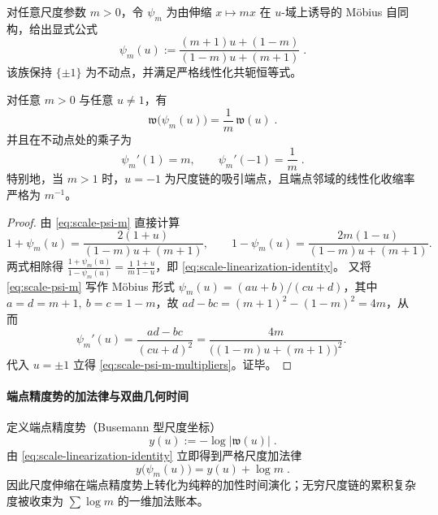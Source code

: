 \medskip
对任意尺度参数 \(m>0\)，令 \(\psi_m\) 为由伸缩 \(x\mapsto mx\) 在 \(u\)-域上诱导的 Möbius 自同构，给出显式公式
\begin{equation}\label{eq:scale-psi-m}
\boxed{\;
\psi_m(u):=\frac{(m+1)u+(1-m)}{(1-m)u+(m+1)}\; }.
\end{equation}
该族保持 \(\{\pm 1\}\) 为不动点，并满足严格线性化共轭恒等式。

\begin{proposition}[严格线性化恒等式与端点乘子]\label{prop:scale-linearization-identity-multipliers}
对任意 \(m>0\) 与任意 \(u\neq 1\)，有
\begin{equation}\label{eq:scale-linearization-identity}
\boxed{\;\mathfrak{w}\!\bigl(\psi_m(u)\bigr)=\frac{1}{m}\,\mathfrak{w}(u)\; }.
\end{equation}
并且在不动点处的乘子为
\begin{equation}\label{eq:scale-psi-m-multipliers}
\boxed{\;\psi_m'(1)=m,\qquad \psi_m'(-1)=\frac{1}{m}\; }.
\end{equation}
特别地，当 \(m>1\) 时，\(u=-1\) 为尺度链的吸引端点，且端点邻域的线性化收缩率严格为 \(m^{-1}\)。
\end{proposition}
\begin{proof}
由 \eqref{eq:scale-psi-m} 直接计算
\[
1+\psi_m(u)=\frac{2(1+u)}{(1-m)u+(m+1)},
\qquad
1-\psi_m(u)=\frac{2m(1-u)}{(1-m)u+(m+1)}.
\]
两式相除得
\(
\frac{1+\psi_m(u)}{1-\psi_m(u)}=\frac{1}{m}\frac{1+u}{1-u}
\)，即 \eqref{eq:scale-linearization-identity}。
又将 \eqref{eq:scale-psi-m} 写作 Möbius 形式 \(\psi_m(u)=(au+b)/(cu+d)\)，其中
\(
a=d=m+1,\ b=c=1-m
\)，故 \(ad-bc=(m+1)^2-(1-m)^2=4m\)，从而
\[
\psi_m'(u)=\frac{ad-bc}{(cu+d)^2}=\frac{4m}{\bigl((1-m)u+(m+1)\bigr)^2}.
\]
代入 \(u=\pm 1\) 立得 \eqref{eq:scale-psi-m-multipliers}。证毕。
\end{proof}

\paragraph{端点精度势的加法律与双曲几何时间}
定义端点精度势（Busemann 型尺度坐标）
\begin{equation}\label{eq:endpoint-busemann-potential}
\boxed{\;y(u):=-\log|\mathfrak{w}(u)|\; }.
\end{equation}
由 \eqref{eq:scale-linearization-identity} 立即得到严格尺度加法律
\begin{equation}\label{eq:endpoint-busemann-addition-law}
\boxed{\;y\!\bigl(\psi_m(u)\bigr)=y(u)+\log m\; }.
\end{equation}
因此尺度伸缩在端点精度势上转化为纯粹的加性时间演化；无穷尺度链的累积复杂度被收束为 \(\sum\log m\) 的一维加法账本。

